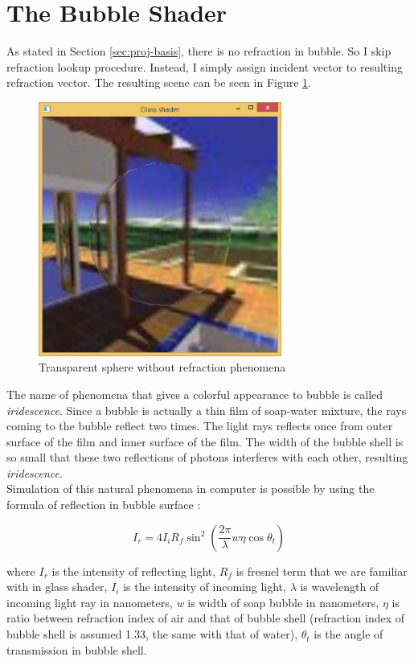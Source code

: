 \section{The Bubble Shader}
\label{sec:proj-shad}

As stated in Section \ref{sec:proj-basis}, there is no refraction in bubble. So I skip refraction lookup procedure. Instead, I simply assign incident vector to resulting refraction vector. The resulting scene can be seen in Figure \ref{fig:report-1}.

\begin{figure}[hp]
\centering
\includegraphics[width=8cm]{../Screenshots/report/1.png}
\caption{Transparent sphere without refraction phenomena}
\label{fig:report-1}
\end{figure}


The name of phenomena that gives a colorful appearance to bubble is called \emph{iridescence}. Since a bubble is actually a thin film of soap-water mixture, the rays coming to the bubble reflect two times. The light rays reflects once from outer surface of the film and inner surface of the film. The width of the bubble shell is so small that these two reflections of photons interferes with each other, resulting \emph{iridescence}.\\
Simulation of this natural phenomena in computer is possible by using the formula of reflection in bubble surface \cite[p.~107]{Glassner:1999:AGN:318952}:

\begin{equation}
I_{r} = 4I_{i}R_{f} \sin^2(\frac{2\pi}{\lambda}w\eta\cos{\theta_{t}})
\end{equation}

where \emph{$I_{r}$} is the intensity of reflecting light, \emph{$R_{f}$} is fresnel term that we are familiar with in glass shader,  \emph{$I_{i}$} is the intensity of incoming light, \emph{$\lambda$} is wavelength of incoming light ray in nanometers, \emph{w} is width of soap bubble in nanometers, \emph{$\eta$} is ratio between refraction index of air and that of bubble shell (refraction index of bubble shell is assumed 1.33, the same with that of water), \emph{$\theta_{t}$} is the angle of transmission in bubble shell. \\

